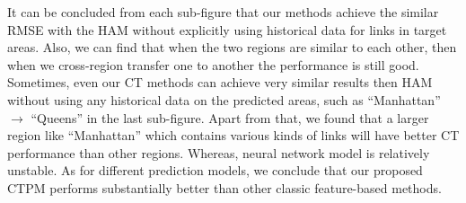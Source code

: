 \documentclass[letterpaper]{article} %
\begin{document}
It can be concluded from each sub-figure that our methods achieve the similar RMSE with the HAM without explicitly using historical data for links in target areas.
Also, we can find that when the two regions are similar to each other, 
then when we cross-region transfer one to another the performance is still good. 
Sometimes, even our CT methods can achieve very similar results then HAM without using any historical data on the predicted areas, such as ``Manhattan'' $\rightarrow$ ``Queens'' in the last sub-figure.
Apart from that, we found that a larger region like ``Manhattan'' which contains various kinds of links will have better CT performance than other regions.
Whereas, neural network model is relatively unstable. 
As for different prediction models, we conclude that our proposed CTPM performs substantially better than other classic feature-based methods.

%





\end{document}
